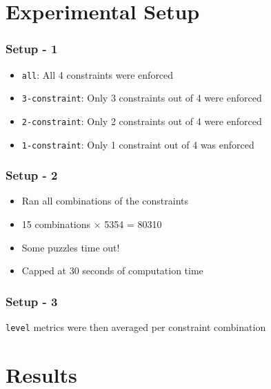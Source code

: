 \documentclass{beamer}
\begin{document}
\section{Experimental Setup}

\begin{frame}
\frametitle{Setup - 1}

\begin{itemize}
	\item \texttt{all}: All 4 constraints were enforced
	\item \texttt{3-constraint}: Only 3 constraints out of 4 were enforced
	\item \texttt{2-constraint}: Only 2 constraints out of 4 were enforced
	\item \texttt{1-constraint}: Only 1 constraint out of 4 was enforced
\end{itemize}
\end{frame}

\begin{frame}
	\frametitle{Setup - 2}
	\begin{itemize}
	\item Ran all combinations of the constraints
	\item 15 combinations $\times$ 5354 = 80310 \pause
	\item Some puzzles time out! \pause
	\item Capped at 30 seconds of computation time
	\end{itemize}
\end{frame}

\begin{frame}
	\frametitle{Setup - 3}
	{\Large \texttt{level} metrics were then averaged per constraint combination} 
\end{frame}

\section{Results}
\end{document}
